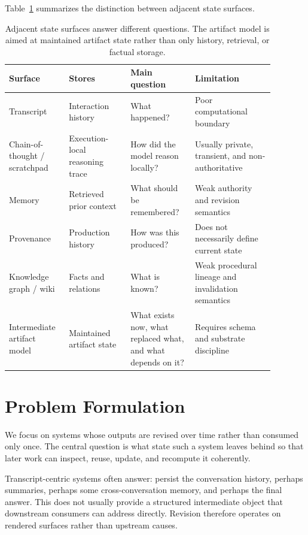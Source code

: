 \documentclass{article}
\begin{document}
Table~\ref{tab:surface-comparison} summarizes the distinction between adjacent state surfaces.

\begin{table}[H]
\centering
\small
\begin{tabular}{p{0.18\linewidth}p{0.21\linewidth}p{0.22\linewidth}p{0.27\linewidth}}
\toprule
Surface & Stores & Main question & Limitation \\
\midrule
Transcript & Interaction history & What happened? & Poor computational boundary \\
Chain-of-thought / scratchpad & Execution-local reasoning trace & How did the model reason locally? & Usually private, transient, and non-authoritative \\
Memory & Retrieved prior context & What should be remembered? & Weak authority and revision semantics \\
Provenance & Production history & How was this produced? & Does not necessarily define current state \\
Knowledge graph / wiki & Facts and relations & What is known? & Weak procedural lineage and invalidation semantics \\
Intermediate artifact model & Maintained artifact state & What exists now, what replaced what, and what depends on it? & Requires schema and substrate discipline \\
\bottomrule
\end{tabular}
\caption{Adjacent state surfaces answer different questions. The artifact model is aimed at maintained artifact state rather than only history, retrieval, or factual storage.}
\label{tab:surface-comparison}
\end{table}

\section{Problem Formulation}

We focus on systems whose outputs are revised over time rather than consumed only once. The central question is what state such a system leaves behind so that later work can inspect, reuse, update, and recompute it coherently.

Transcript-centric systems often answer: persist the conversation history, perhaps summaries, perhaps some cross-conversation memory, and perhaps the final answer. This does not usually provide a structured intermediate object that downstream consumers can address directly. Revision therefore operates on rendered surfaces rather than upstream causes.
\end{document}
